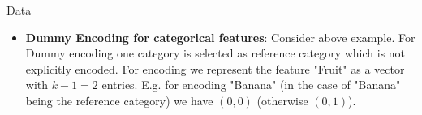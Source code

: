 \documentclass[11pt,compress,t,notes=noshow, xcolor=table]{beamer}
\begin{document}
\begin{vbframe}{Data}
\begin{itemize}
\begin{itemize}

    \item \small \textbf{Dummy Encoding for categorical features}: Consider above example. For Dummy encoding one category is selected as reference category which is not explicitly encoded. For encoding we represent the feature "Fruit"  as a vector with $k - 1 = 2$ entries. E.g. for encoding "Banana" (in the case of "Banana" being the reference category) we have $(0,0)$ (otherwise $(0,1)$).
 
\end{itemize}

\end{itemize}

\end{vbframe}
\end{document}
